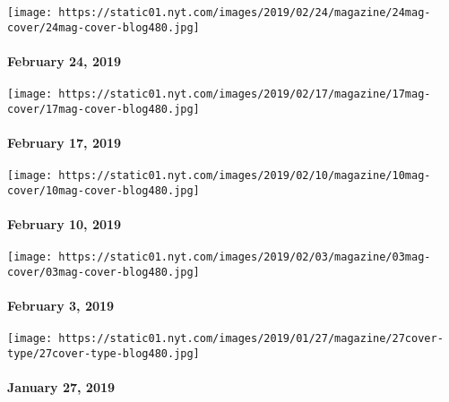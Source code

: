 \href{https://www.nytimes.com/issue/magazine/2019/02/22/the-24219-issue}{}

\texttt{[image: https://static01.nyt.com/images/2019/02/24/magazine/24mag-cover/24mag-cover-blog480.jpg]}

\hypertarget{february-24-2019}{%
\paragraph{February 24, 2019}\label{february-24-2019}}

\href{https://www.nytimes.com/issue/magazine/2019/02/19/the-21719-issue}{}

\texttt{[image: https://static01.nyt.com/images/2019/02/17/magazine/17mag-cover/17mag-cover-blog480.jpg]}

\hypertarget{february-17-2019}{%
\paragraph{February 17, 2019}\label{february-17-2019}}

\href{https://www.nytimes.com/issue/magazine/2019/02/08/the-021019-issue}{}

\texttt{[image: https://static01.nyt.com/images/2019/02/10/magazine/10mag-cover/10mag-cover-blog480.jpg]}

\hypertarget{february-10-2019}{%
\paragraph{February 10, 2019}\label{february-10-2019}}

\href{https://www.nytimes.com/issue/magazine/2019/02/08/the-020319-issue}{}

\texttt{[image: https://static01.nyt.com/images/2019/02/03/magazine/03mag-cover/03mag-cover-blog480.jpg]}

\hypertarget{february-3-2019}{%
\paragraph{February 3, 2019}\label{february-3-2019}}

\href{https://www.nytimes.com/issue/magazine/2019/01/28/the-12719-issue}{}

\texttt{[image: https://static01.nyt.com/images/2019/01/27/magazine/27cover-type/27cover-type-blog480.jpg]}

\hypertarget{january-27-2019}{%
\paragraph{January 27, 2019}\label{january-27-2019}}

